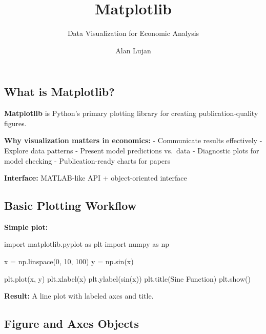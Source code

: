 \documentclass[
  letterpaper,
  DIV=11,
  numbers=noendperiod]{scrartcl}
\title{Matplotlib}
\subtitle{Data Visualization for Economic Analysis}
\author{Alan Lujan}
\date{}
\newenvironment{Shaded}{\begin{snugshade}}{\end{snugshade}}
\newcommand{\DecValTok}[1]{\textcolor[rgb]{0.68,0.00,0.00}{#1}}
\newcommand{\ImportTok}[1]{\textcolor[rgb]{0.00,0.46,0.62}{#1}}
\newcommand{\NormalTok}[1]{\textcolor[rgb]{0.00,0.23,0.31}{#1}}
\newcommand{\OperatorTok}[1]{\textcolor[rgb]{0.37,0.37,0.37}{#1}}
\newcommand{\StringTok}[1]{\textcolor[rgb]{0.13,0.47,0.30}{#1}}
\begin{document}
\maketitle


\subsection{What is Matplotlib?}\label{what-is-matplotlib}

\textbf{Matplotlib} is Python's primary plotting library for creating
publication-quality figures.

\textbf{Why visualization matters in economics:} - Communicate results
effectively - Explore data patterns - Present model predictions vs.~data
- Diagnostic plots for model checking - Publication-ready charts for
papers

\textbf{Interface:} MATLAB-like API + object-oriented interface

\subsection{Basic Plotting Workflow}\label{basic-plotting-workflow}

\textbf{Simple plot:}

\begin{Shaded}
\begin{Highlighting}[]
\ImportTok{import}\NormalTok{ matplotlib.pyplot }\ImportTok{as}\NormalTok{ plt}
\ImportTok{import}\NormalTok{ numpy }\ImportTok{as}\NormalTok{ np}

\NormalTok{x }\OperatorTok{=}\NormalTok{ np.linspace(}\DecValTok{0}\NormalTok{, }\DecValTok{10}\NormalTok{, }\DecValTok{100}\NormalTok{)}
\NormalTok{y }\OperatorTok{=}\NormalTok{ np.sin(x)}

\NormalTok{plt.plot(x, y)}
\NormalTok{plt.xlabel(}\StringTok{\textquotesingle{}x\textquotesingle{}}\NormalTok{)}
\NormalTok{plt.ylabel(}\StringTok{\textquotesingle{}sin(x)\textquotesingle{}}\NormalTok{)}
\NormalTok{plt.title(}\StringTok{\textquotesingle{}Sine Function\textquotesingle{}}\NormalTok{)}
\NormalTok{plt.show()}
\end{Highlighting}
\end{Shaded}

\textbf{Result:} A line plot with labeled axes and title.

\subsection{Figure and Axes Objects}\label{figure-and-axes-objects}
\end{document}
